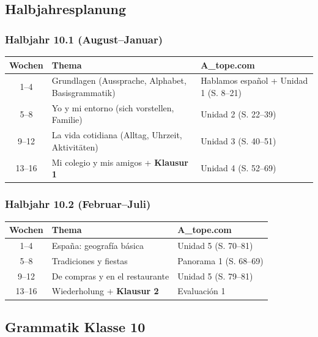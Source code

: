 \documentclass[10pt,a4paper]{article}
\begin{document}
\subsection{Halbjahresplanung}

\subsubsection{Halbjahr 10.1 (August--Januar)}

\begin{center}
\small
\begin{tabular}{|c|p{5cm}|p{6cm}|}
\hline
\rowcolor{lightgray}
\textbf{Wochen} & \textbf{Thema} & \textbf{A\_tope.com} \\
\hline
1--4 & Grundlagen (Aussprache, Alphabet, Basisgrammatik) & Hablamos español + Unidad 1 (S. 8--21) \\
\hline
5--8 & Yo y mi entorno (sich vorstellen, Familie) & Unidad 2 (S. 22--39) \\
\hline
9--12 & La vida cotidiana (Alltag, Uhrzeit, Aktivitäten) & Unidad 3 (S. 40--51) \\
\hline
13--16 & Mi colegio y mis amigos + \textbf{Klausur 1} & Unidad 4 (S. 52--69) \\
\hline
\end{tabular}
\end{center}

\subsubsection{Halbjahr 10.2 (Februar--Juli)}

\begin{center}
\small
\begin{tabular}{|c|p{5cm}|p{6cm}|}
\hline
\rowcolor{lightgray}
\textbf{Wochen} & \textbf{Thema} & \textbf{A\_tope.com} \\
\hline
1--4 & España: geografía básica & Unidad 5 (S. 70--81) \\
\hline
5--8 & Tradiciones y fiestas & Panorama 1 (S. 68--69) \\
\hline
9--12 & De compras y en el restaurante & Unidad 5 (S. 79--81) \\
\hline
13--16 & Wiederholung + \textbf{Klausur 2} & Evaluación 1 \\
\hline
\end{tabular}
\end{center}

\subsection{Grammatik Klasse 10}
\end{document}
